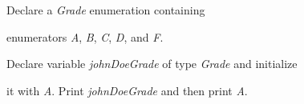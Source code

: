 Declare a \textit{Grade} enumeration containing

enumerators \textit{A}, \textit{B}, \textit{C}, \textit{D}, and \textit{F}.

Declare variable \textit{johnDoeGrade} of type \textit{Grade} and initialize

it with \textit{A}. Print \textit{johnDoeGrade} and then print \textit{A}.

